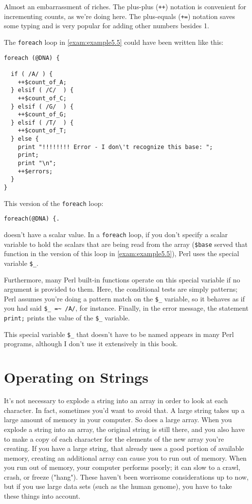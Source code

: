 Almost an embarrassment of riches. The plus-plus (\verb|++|) notation is convenient for incrementing counts, as we're doing here. The plus-equals (\verb|+=|) notation saves some typing and is very popular for adding other numbers besides 1.

The \verb|foreach| loop in \autoref{exam:example5.5} could have been written like this:

\begin{lstlisting}
foreach (@DNA) {
  
  if ( /A/ ) {
    ++$count_of_A;
  } elsif ( /C/  ) {
    ++$count_of_C;
  } elsif ( /G/  ) {
    ++$count_of_G;
  } elsif ( /T/  ) {
    ++$count_of_T;
  } else {
    print "!!!!!!!! Error - I don\'t recognize this base: ";
    print;
    print "\n";
    ++$errors;
  }
}
\end{lstlisting}

This version of the \verb|foreach| loop:

\begin{lstlisting}
foreach(@DNA) {.
\end{lstlisting}

doesn't have a scalar value. In a \verb|foreach| loop, if you don't specify a scalar variable to hold the scalars that are being read from the array (\verb|$base| served that function in the version of this loop in \autoref{exam:example5.5}), Perl uses the special variable \verb|$_|.

Furthermore, many Perl built-in functions operate on this special variable if no argument is provided to them. Here, the conditional tests are simply patterns; Perl assumes you're doing a pattern match on the \verb|$_| variable, so it behaves as if you had said \verb|$_ =~ /A/|, for instance. Finally, in the error message, the statement \verb|print;| prints the value of the \verb|$_| variable.

This special variable \verb|$_| that doesn't have to be named appears in many Perl programs, although I don't use it extensively in this book. 

\section{Operating on Strings}
It's not necessary to explode a string into an array in order to look at each character. In fact, sometimes you'd want to avoid that. A large string takes up a large amount of memory in your computer. So does a large array. When you explode a string into an array, the original string is still there, and you also have to make a copy of each character for the elements of the new array you're creating. If you have a large string, that already uses a good portion of available memory, creating an additional array can cause you to run out of memory. When you run out of memory, your computer performs poorly; it can slow to a crawl, crash, or freeze ("hang"). These haven't been worrisome considerations up to now, but if you use large data sets (such as the human genome), you have to take these things into account.


